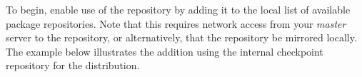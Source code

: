 To begin, enable use of the \FSP{} repository by adding it to the local list of
available package repositories.  Note that this requires network access from
your {\em master} server to the \FSP{} repository, or alternatively, that the \FSP{}
repository be mirrored locally. The example below illustrates the addition
using the internal \FSP{} checkpoint repository for the \baseOS{} distribution.
